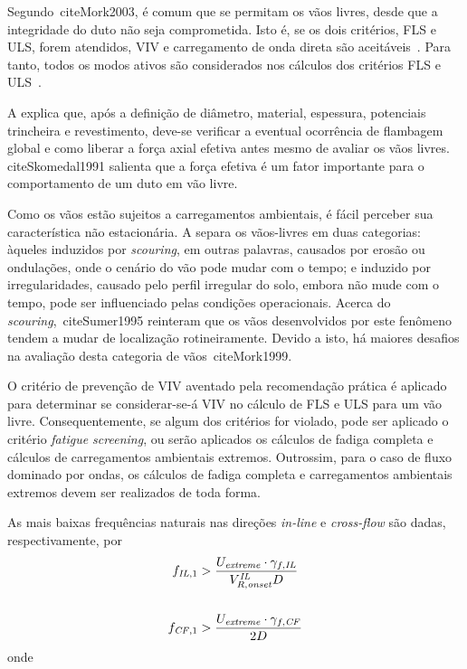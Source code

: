 Segundo~cite{Mork2003}, é comum que se permitam os vãos livres, desde que a integridade do duto não seja comprometida.
Isto é, se os dois critérios, FLS e ULS, forem atendidos, VIV e carregamento de onda direta são aceitáveis~\cite{DNV2017}.
Para tanto, todos os modos ativos são considerados nos cálculos dos critérios FLS e ULS~\cite{Mork2003}.

A  explica que, após a definição de diâmetro, material, espessura, potenciais trincheira e revestimento, deve-se verificar a eventual ocorrência de flambagem global e como liberar a força axial efetiva antes mesmo de avaliar os vãos livres.
cite{Skomedal1991} salienta que a força efetiva é um fator importante para o comportamento de um duto em vão livre.

Como os vãos estão sujeitos a carregamentos ambientais, é fácil perceber sua característica não estacionária.
A  separa os vãos-livres em duas categorias: àqueles induzidos por \textit{scouring}, em outras palavras, causados por erosão ou ondulações, onde o cenário do vão pode mudar com o tempo; e induzido por irregularidades, causado pelo perfil irregular do solo, embora não mude com o tempo, pode ser influenciado pelas condições operacionais.
Acerca do \textit{scouring},~cite{Sumer1995} reinteram que os vãos desenvolvidos por este fenômeno tendem a mudar de localização rotineiramente.
Devido a isto, há maiores desafios na avaliação desta categoria de vãos~cite{Mork1999}.

O critério de prevenção de VIV aventado pela recomendação prática é aplicado para determinar se considerar-se-á VIV no cálculo de FLS e ULS para um vão livre.
Consequentemente, se algum dos critérios for violado, pode ser aplicado o critério \textit{fatigue screening}, ou serão aplicados os cálculos de fadiga completa e cálculos de carregamentos ambientais extremos.
Outrossim, para o caso de fluxo dominado por ondas, os cálculos de fadiga completa e carregamentos ambientais extremos devem ser realizados de toda forma.

As mais baixas frequências naturais nas direções \textit{in-line} e \textit{cross-flow} são dadas, respectivamente, por
\begin{equation}
\label{eq:viv-ineq}
\begin{aligned}
f_{\mathit{IL},1} &> \frac{U_\mathit{extreme} \cdot \gamma_{f, \mathit{IL}}}{ V_{R, \mathit{onset}}^\mathit{IL} D}\\
\\
f_{\mathit{CF},1} &> \frac{U_\mathit{extreme} \cdot \gamma_{f, \mathit{CF}}}{2 D}
\end{aligned}\\
\end{equation}
onde

